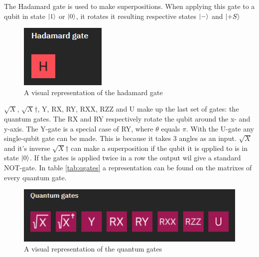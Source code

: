 The Hadamard gate is used to make superpositions. When applying this gate to a qubit in state $\ket{1}$ or $\ket{0}$, it rotates it resulting respective states $\ket{-}$ and $\ket{+S}$

\begin{figure} [h]
    \centering
    \includegraphics[width=\textwidth]{img/hadamard-gate.PNG}
        \caption{A visual representation of the hadamard gate}
        \label{fig:hadamard gates}
\end{figure}

$\sqrt{X}$, $\sqrt{X}$$\dagger$, Y, RX, RY, RXX, RZZ and U make up the last set of gates: the quantum gates. 
The RX and RY respectively rotate the qubit around the x- and y-axis. The Y-gate is a special case of RY, where $\theta$ equals $\pi$.
With the U-gate any single-qubit gate can be made. This is because it takes 3 angles as an input.
$\sqrt{X}$ and it's inverse $\sqrt{X}$$\dagger$ can make a superposition if the qubit it is qpplied to is in state $\ket{0}$. If the gates is applied twice in a row the output wil give a standard NOT-gate.
In table \ref{tab:qgates} a representation can be found on the matrixes of every quantum gate.

\begin{figure} [h]
    \centering
    \includegraphics[width=\textwidth]{img/quantum-gates.PNG}
        \caption{A visual representation of the quantum gates}
        \label{fig:quantum gates}
\end{figure}

